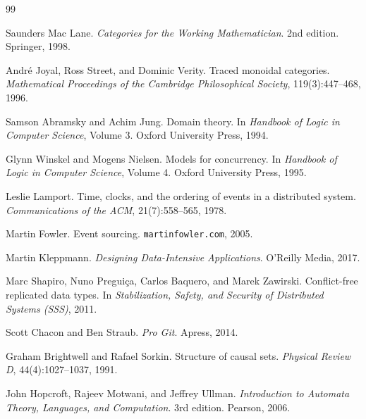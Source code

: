 \documentclass[12pt]{article}
\begin{document}
\begin{thebibliography}{99}

Saunders Mac Lane.
\textit{Categories for the Working Mathematician}.
2nd edition. Springer, 1998.

Andr\'e Joyal, Ross Street, and Dominic Verity.
Traced monoidal categories.
\textit{Mathematical Proceedings of the Cambridge Philosophical Society},
119(3):447--468, 1996.

Samson Abramsky and Achim Jung.
Domain theory.
In \textit{Handbook of Logic in Computer Science}, Volume 3.
Oxford University Press, 1994.

Glynn Winskel and Mogens Nielsen.
Models for concurrency.
In \textit{Handbook of Logic in Computer Science}, Volume 4.
Oxford University Press, 1995.

Leslie Lamport.
Time, clocks, and the ordering of events in a distributed system.
\textit{Communications of the ACM}, 21(7):558--565, 1978.

Martin Fowler.
Event sourcing.
\texttt{martinfowler.com}, 2005.

Martin Kleppmann.
\textit{Designing Data-Intensive Applications}.
O'Reilly Media, 2017.

Marc Shapiro, Nuno Pregui\c{c}a, Carlos Baquero, and Marek Zawirski.
Conflict-free replicated data types.
In \textit{Stabilization, Safety, and Security of Distributed Systems (SSS)}, 2011.

Scott Chacon and Ben Straub.
\textit{Pro Git}.
Apress, 2014.

Graham Brightwell and Rafael Sorkin.
Structure of causal sets.
\textit{Physical Review D}, 44(4):1027--1037, 1991.

John Hopcroft, Rajeev Motwani, and Jeffrey Ullman.
\textit{Introduction to Automata Theory, Languages, and Computation}.
3rd edition. Pearson, 2006.

\end{thebibliography}
\end{document}
